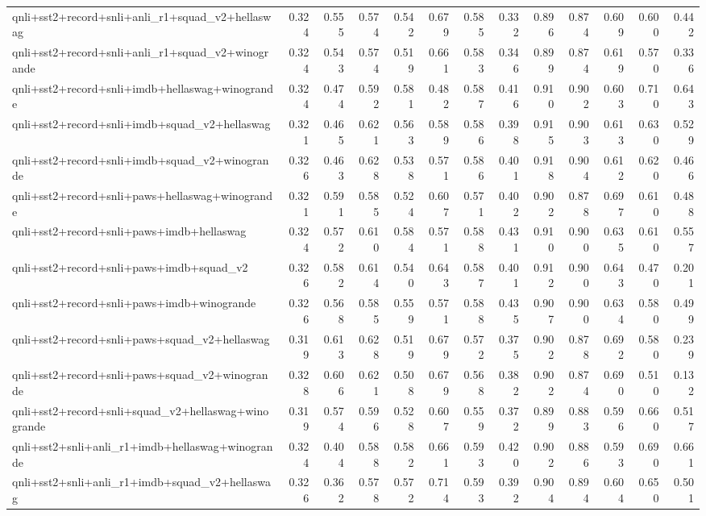 \begin{table}[t]
\begin{tabular}{lrrrrrrrrrrrr}
    qnli+sst2+record+snli+anli\_r1+squad\_v2+hellaswag & 0.324 & 0.555 & 0.574 & 0.542 & 0.679 & 0.585 & 0.332 & 0.896 & 0.874 & 0.609 & 0.600 & 0.442 \\
    qnli+sst2+record+snli+anli\_r1+squad\_v2+winogrande & 0.324 & 0.543 & 0.574 & 0.519 & 0.661 & 0.583 & 0.346 & 0.899 & 0.874 & 0.619 & 0.570 & 0.336 \\
    qnli+sst2+record+snli+imdb+hellaswag+winogrande & 0.324 & 0.474 & 0.592 & 0.581 & 0.482 & 0.587 & 0.416 & 0.910 & 0.902 & 0.603 & 0.710 & 0.643 \\
    qnli+sst2+record+snli+imdb+squad\_v2+hellaswag & 0.321 & 0.465 & 0.621 & 0.563 & 0.589 & 0.586 & 0.398 & 0.915 & 0.903 & 0.613 & 0.630 & 0.529 \\
    qnli+sst2+record+snli+imdb+squad\_v2+winogrande & 0.326 & 0.463 & 0.628 & 0.538 & 0.571 & 0.586 & 0.401 & 0.918 & 0.904 & 0.612 & 0.620 & 0.466 \\
    qnli+sst2+record+snli+paws+hellaswag+winogrande & 0.321 & 0.591 & 0.585 & 0.524 & 0.607 & 0.571 & 0.402 & 0.902 & 0.878 & 0.697 & 0.610 & 0.488 \\
    qnli+sst2+record+snli+paws+imdb+hellaswag & 0.324 & 0.572 & 0.610 & 0.584 & 0.571 & 0.588 & 0.431 & 0.910 & 0.900 & 0.635 & 0.610 & 0.557 \\
    qnli+sst2+record+snli+paws+imdb+squad\_v2 & 0.326 & 0.582 & 0.614 & 0.540 & 0.643 & 0.587 & 0.401 & 0.912 & 0.900 & 0.643 & 0.470 & 0.201 \\
    qnli+sst2+record+snli+paws+imdb+winogrande & 0.326 & 0.568 & 0.585 & 0.559 & 0.571 & 0.588 & 0.435 & 0.907 & 0.900 & 0.634 & 0.580 & 0.499 \\
    qnli+sst2+record+snli+paws+squad\_v2+hellaswag & 0.319 & 0.613 & 0.628 & 0.519 & 0.679 & 0.572 & 0.375 & 0.902 & 0.878 & 0.692 & 0.580 & 0.239 \\
    qnli+sst2+record+snli+paws+squad\_v2+winogrande & 0.328 & 0.606 & 0.621 & 0.508 & 0.679 & 0.568 & 0.382 & 0.902 & 0.874 & 0.690 & 0.510 & 0.132 \\
    qnli+sst2+record+snli+squad\_v2+hellaswag+winogrande & 0.319 & 0.574 & 0.596 & 0.528 & 0.607 & 0.559 & 0.372 & 0.899 & 0.883 & 0.596 & 0.660 & 0.517 \\
    qnli+sst2+snli+anli\_r1+imdb+hellaswag+winogrande & 0.324 & 0.404 & 0.588 & 0.582 & 0.661 & 0.593 & 0.420 & 0.902 & 0.886 & 0.593 & 0.690 & 0.661 \\
    qnli+sst2+snli+anli\_r1+imdb+squad\_v2+hellaswag & 0.326 & 0.362 & 0.578 & 0.572 & 0.714 & 0.593 & 0.392 & 0.904 & 0.894 & 0.604 & 0.650 & 0.501 \\

\end{tabular}
\end{table}
